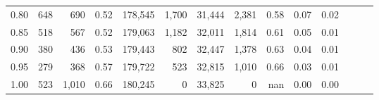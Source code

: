 \begin{tabular}{rrrrrrrrrrrrrr}
0.80 &     648 &    690 &  0.52 &  178,545 &    1,700 &  31,444 &   2,381 &  0.58 &  0.07 &      0.02 \\
0.85 &     518 &    567 &  0.52 &  179,063 &    1,182 &  32,011 &   1,814 &  0.61 &  0.05 &      0.01 \\
0.90 &     380 &    436 &  0.53 &  179,443 &      802 &  32,447 &   1,378 &  0.63 &  0.04 &      0.01 \\
0.95 &     279 &    368 &  0.57 &  179,722 &      523 &  32,815 &   1,010 &  0.66 &  0.03 &      0.01 \\
1.00 &     523 &  1,010 &  0.66 &  180,245 &        0 &  33,825 &       0 &   nan &  0.00 &      0.00 \\
\bottomrule
\end{tabular}
